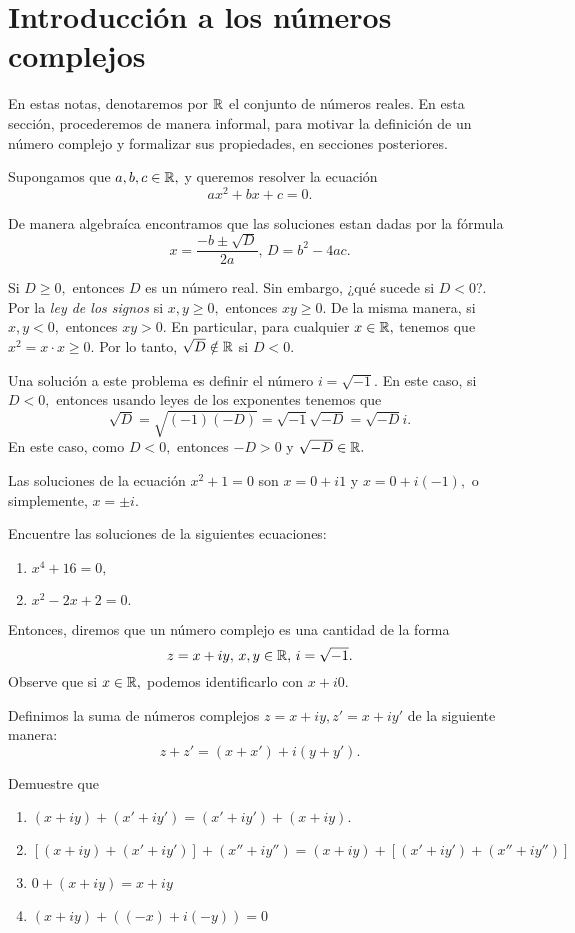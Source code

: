 \section{Introducción a los números complejos}

En estas notas, denotaremos por $\mathbb{R}$ el conjunto de números reales. En esta sección, procederemos de manera informal,
para motivar la definición de un número complejo y formalizar sus propiedades, en secciones posteriores. 


Supongamos que $a,b,c\in \mathbb{R},$ y queremos resolver
la ecuación
$$
ax^2+bx+c=0.
$$

De manera algebraíca encontramos que las soluciones estan dadas por la fórmula
$$
x=\dfrac{-b\pm \sqrt{D}}{2a}, \, D=b^2-4ac.
$$

Si $D \geq 0,$ entonces $D$ es un número real. Sin embargo, ¿qué sucede si $D<0$?. Por la \emph{ley de los signos} si
$x,y\geq 0,$ entonces $xy\geq 0.$ De la misma manera, si $x,y<0,$ entonces $xy>0.$ En particular, para cualquier
$x\in \mathbb{R},$ tenemos que $x^{2}=x\cdot x\geq 0.$ Por lo tanto, $\sqrt{D} \notin \mathbb{R}$ si $D<0.$

Una solución a este problema es definir el número $i=\sqrt{-1}.$ En este caso, si $D<0,$ entonces usando leyes de los
exponentes tenemos que
$$
\sqrt{D}=\sqrt{(-1)(-D)}=\sqrt{-1}\sqrt{-D}=\sqrt{-D}i.
$$
En este caso, como $D<0,$ entonces $-D>0$ y $\sqrt{-D}\in \mathbb{R}.$

\begin{problema}
 Las soluciones de la ecuación $x^2+1=0$ son $x=0+i1$ y $x=0+i(-1),$ o simplemente, $x=\pm i.$
\end{problema}

\begin{problema}
 Encuentre las soluciones de la siguientes ecuaciones:
 \begin{enumerate}
  \item $x^{4}+16=0,$
  \item $x^{2}-2x+2=0.$
 \end{enumerate}

\end{problema}


 Entonces, diremos que un número complejo es una cantidad de la forma
 $$
z=x+iy, \, x,y\in \mathbb{R}, \, i=\sqrt{-1}.
 $$
 Observe que si $x\in \mathbb{R},$ podemos identificarlo con $x+i0.$

Definimos la suma de números complejos $z=x+iy,z'=x+iy'$ de la siguiente manera:
$$
z+z'=(x+x')+i(y+y').
$$

\begin{problema}
Demuestre que 
\begin{enumerate}
 \item $(x+iy)+(x'+iy')=(x'+iy')+(x+iy).$
 \item $\left[ (x+iy)+(x'+iy') \right] +(x''+iy'')= (x+iy)+\left[ (x'+iy') +(x''+iy'') \right]$
 \item $0+(x+iy)=x+iy$
 \item $(x+iy)+((-x)+i(-y))=0$
\end{enumerate}\end{problema}

